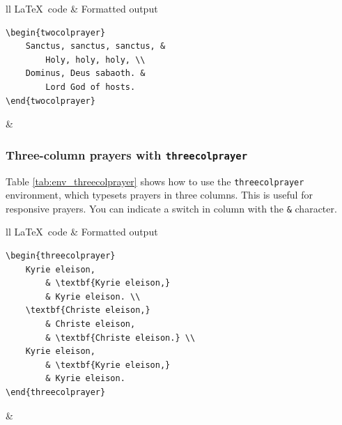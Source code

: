 \documentclass{article}
\begin{document}
\begin{table}[h!]
\centering
\begin{tabular}{ll}
\toprule
\LaTeX\ code & Formatted output \\
\midrule
\begin{lstlisting}
\begin{twocolprayer}
	Sanctus, sanctus, sanctus, &
		Holy, holy, holy, \\
	Dominus, Deus sabaoth. &
		Lord God of hosts.
\end{twocolprayer}
\end{lstlisting}
&
\\
\bottomrule
\end{tabular}
\caption{The \lstinline{twocolprayer} environment.}
\label{tab:env_twocolprayer}
\end{table}

\subsubsection{Three-column prayers with \lstinline{threecolprayer}}

Table \ref{tab:env_threecolprayer} shows how to use the \lstinline{threecolprayer} environment, which typesets prayers in three columns. This is useful for responsive prayers. You can indicate a switch in column with the \lstinline{&} character.

\begin{table}[h!]
\centering
\begin{tabular}{ll}
\toprule
\LaTeX\ code & Formatted output \\
\midrule
\begin{lstlisting}
\begin{threecolprayer}
	Kyrie eleison, 
		& \textbf{Kyrie eleison,}
		& Kyrie eleison. \\
	\textbf{Christe eleison,}
		& Christe eleison,
		& \textbf{Christe eleison.} \\
	Kyrie eleison,
		& \textbf{Kyrie eleison,}
		& Kyrie eleison.
\end{threecolprayer}
\end{lstlisting}
&
\\
\bottomrule
\end{tabular}
\caption{The \lstinline{threecolprayer} environment.}
\label{tab:env_threecolprayer}
\end{table}
\end{document}

